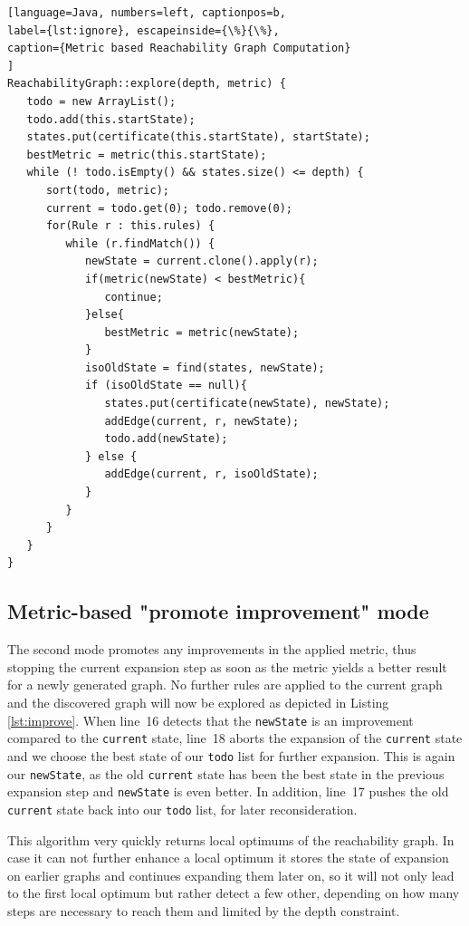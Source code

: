 \documentclass[submission,copyright,creativecommons]{eptcs}
\begin{document}
\begin{lstlisting}[language=Java, numbers=left, captionpos=b, 
label={lst:ignore}, escapeinside={\%}{\%},
caption={Metric based Reachability Graph Computation}
]
ReachabilityGraph::explore(depth, metric) {
   todo = new ArrayList();
   todo.add(this.startState);
   states.put(certificate(this.startState), startState);
   bestMetric = metric(this.startState);
   while (! todo.isEmpty() && states.size() <= depth) {
      sort(todo, metric);
      current = todo.get(0); todo.remove(0);
      for(Rule r : this.rules) {
         while (r.findMatch()) {
            newState = current.clone().apply(r);
            if(metric(newState) < bestMetric){
               continue;
            }else{
               bestMetric = metric(newState);
            }
            isoOldState = find(states, newState);
            if (isoOldState == null){
               states.put(certificate(newState), newState);
               addEdge(current, r, newState);
               todo.add(newState);
            } else {
               addEdge(current, r, isoOldState);
            }
         }
      }
   }
}
\end{lstlisting}


\subsection{Metric-based "promote improvement" mode}

The second mode promotes any improvements in the applied metric, thus stopping 
the current expansion step as soon as the metric yields a better result for a 
newly generated graph. No further rules are applied to the current graph and 
the discovered graph will now be explored as depicted in Listing 
\ref{lst:improve}. When line~16 detects that the \texttt{newState} is an improvement 
compared to the \texttt{current} state, line~18 aborts the expansion of the 
\texttt{current} state and we choose the best state of our \texttt{todo} 
list for further expansion. This is again our \texttt{newState}, 
as the old \texttt{current} state has been the best state in the previous 
expansion step and \texttt{newState} is even better. In addition, 
line~17 pushes the old \texttt{current} state back into our \texttt{todo} list, for later 
reconsideration.   

This algorithm very quickly returns 
local optimums of the reachability graph. In case it can not further enhance a 
local optimum it stores the state of expansion on earlier graphs and continues 
expanding them later on, so it will not only lead to the first local optimum 
but rather detect a few other, depending on how many steps are necessary to reach 
them and limited by the depth constraint. 
\end{document}
